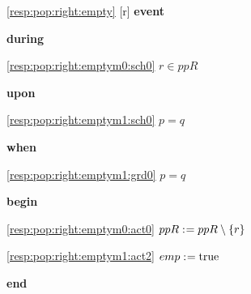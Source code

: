\noindent \ref{resp:pop:right:empty} [r] \textbf{event}
\begin{block}
  \item   \textbf{during}
  \begin{block}
  \item[ \eqref{resp:pop:right:emptym0:sch0} ]{$r \in ppR $} %
  \end{block}
  \item   \textbf{upon}
  \begin{block}
  \item[ \eqref{resp:pop:right:emptym1:sch0} ]{$p = q $} %
  \end{block}
  \item   \textbf{when}
  \begin{block}
  \item[ \eqref{resp:pop:right:emptym1:grd0} ]{$p = q $} %
  \end{block}
  \item   \textbf{begin}
  \begin{block}
  \item[ \eqref{resp:pop:right:emptym0:act0} ]{$ppR \mathrel{:\mkern1mu=} ppR \setminus \{ r \} $} %
  \item[ \eqref{resp:pop:right:emptym1:act2} ]{$emp \mathrel{:\mkern1mu=} \text{true} $} %
  \end{block}
  \item   \textbf{end} \\
\end{block}
